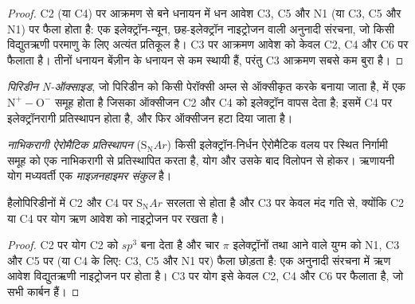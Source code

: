 \begin{proof}
C2 (या C4) पर आक्रमण से बने धनायन में धन आवेश C3, C5
और N1 (या C3, C5 और N1) पर फैला होता है: एक इलेक्ट्रॉन-न्यून, छह-इलेक्ट्रॉन
नाइट्रोजन वाली अनुनादी संरचना, जो किसी विद्युतऋणी परमाणु के लिए अत्यंत प्रतिकूल है। C3 पर
आक्रमण आवेश को केवल C2, C4 और C6 पर फैलाता है। तीनों धनायन बेंज़ीन के धनायन से कम
स्थायी हैं, परंतु C3 आक्रमण सबसे कम बुरा है।
\end{proof}

\begin{definition}[पिरिडीन N-ऑक्साइड]\label{def:b3:heterocycles:n-oxide}
\emph{पिरिडीन N-ऑक्साइड}, जो पिरिडीन को किसी पेरॉक्सी अम्ल से
ऑक्सीकृत करके बनाया जाता है, में एक $\mathrm{N^+{-}O^-}$ समूह होता है जिसका ऑक्सीजन C2
और C4 को इलेक्ट्रॉन वापस देता है; इसमें C4 पर इलेक्ट्रॉनरागी प्रतिस्थापन होता है, और फिर
ऑक्सीजन हटा दिया जाता है।
\end{definition}

\begin{definition}[नाभिकरागी ऐरोमैटिक प्रतिस्थापन]\label{def:b3:heterocycles:snar}
\emph{नाभिकरागी ऐरोमैटिक प्रतिस्थापन}
($\mathrm S_\mathrm NAr$) किसी इलेक्ट्रॉन-निर्धन ऐरोमैटिक वलय पर स्थित निर्गामी समूह को
एक नाभिकरागी से प्रतिस्थापित करता है, योग और उसके बाद विलोपन से होकर। ऋणायनी
योग मध्यवर्ती एक \emph{माइज़नहाइमर संकुल} है।
\end{definition}

\begin{proposition}\label{prop:b3:heterocycles:snar-positions}
हैलोपिरिडीनों में C2 और C4 पर $\mathrm S_\mathrm NAr$ सरलता से होता है और C3 पर केवल मंद गति से,
क्योंकि C2 या C4 पर योग ऋण आवेश को नाइट्रोजन पर रखता है।
\end{proposition}

\begin{proof}
C2 पर योग C2 को $sp^3$ बना देता है और चार $\pi$ इलेक्ट्रॉनों तथा आने वाले युग्म को
N1, C3 और C5 पर (या C4 के लिए: C3, C5 और N1 पर) फैला छोड़ता है: एक अनुनादी संरचना में
ऋण आवेश विद्युतऋणी नाइट्रोजन पर होता है। C3 पर योग इसे केवल
C2, C4 और C6 पर फैलाता है, जो सभी कार्बन हैं।
\end{proof}

